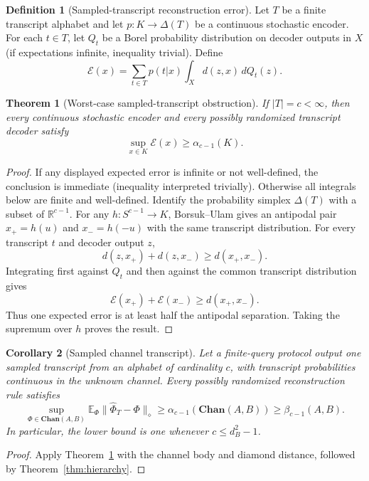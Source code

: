 \documentclass[11pt,a4paper]{article}
\theoremstyle{definition}
\newtheorem{definition}{Definition}[section]
\theoremstyle{plain}
\newtheorem{theorem}{Theorem}[section]
\newtheorem{corollary}[theorem]{Corollary}
\theoremstyle{remark}
\newcommand{\Chan}{\mathbf{Chan}}
\begin{document}
\begin{definition}[Sampled-transcript reconstruction error]
Let $T$ be a finite transcript alphabet and let
$p:K\to\Delta(T)$ be a continuous stochastic encoder. For each
$t\in T$, let $Q_t$ be a Borel probability distribution on decoder outputs
in $X$ (if expectations infinite, inequality trivial). Define
\[
\mathcal E(x)
=\sum_{t\in T}p(t|x)
  \int_Xd(z,x)\,dQ_t(z).
\]
\end{definition}

\begin{theorem}[Worst-case sampled-transcript obstruction]
\label{thm:sampled-transcript}
If $|T|=c<\infty$, then every continuous stochastic encoder and every
possibly randomized transcript decoder satisfy
\[
\sup_{x\in K}\mathcal E(x)\geq\alpha_{c-1}(K).
\]
\end{theorem}

\begin{proof}
If any displayed expected error is infinite or not well-defined, the conclusion is immediate (inequality interpreted trivially).
Otherwise all integrals below are finite and well-defined. Identify the probability simplex
$\Delta(T)$ with a subset of $\mathbb R^{c-1}$. For any
$h:S^{c-1}\to K$, Borsuk--Ulam gives an
antipodal pair $x_+=h(u)$ and $x_-=h(-u)$ with the same transcript
distribution. For every transcript $t$ and decoder output $z$,
\[
d(z,x_+)+d(z,x_-)\geq d(x_+,x_-).
\]
Integrating first against $Q_t$ and then against the common transcript
distribution gives
\[
\mathcal E(x_+)+\mathcal E(x_-)
\geq d(x_+,x_-).
\]
Thus one expected error is at least half the antipodal separation. Taking
the supremum over $h$ proves the result.
\end{proof}

\begin{corollary}[Sampled channel transcript]
\label{cor:sampled-channel-transcript}
Let a finite-query protocol output one sampled transcript from an alphabet
of cardinality $c$, with transcript probabilities continuous in the unknown
channel. Every possibly randomized reconstruction rule satisfies
\[
\sup_{\Phi\in\Chan(A,B)}
\mathbb E_\Phi
\|\widehat\Phi_T-\Phi\|_\diamond
\geq\alpha_{c-1}(\Chan(A,B))
\geq\beta_{c-1}(A,B).
\]
In particular, the lower bound is one whenever $c\leq d_B^2-1$.
\end{corollary}

\begin{proof}
Apply Theorem~\ref{thm:sampled-transcript} with the channel body and diamond
distance, followed by Theorem~\ref{thm:hierarchy}.
\end{proof}
\end{document}
